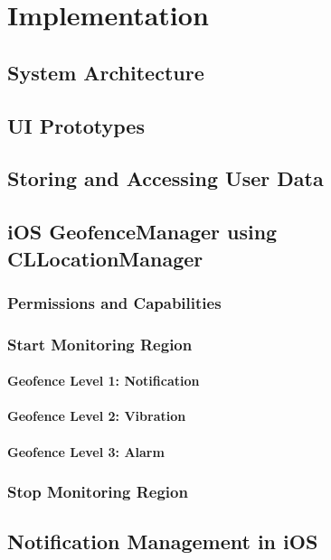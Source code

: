 \chapter{Implementation}
\label{cha:Implementation}

\section{System Architecture}
\section{UI Prototypes}
\section{Storing and Accessing User Data}

\section{iOS GeofenceManager using CLLocationManager}
\subsection{Permissions and Capabilities}
\subsection{Start Monitoring Region}
\subsubsection{Geofence Level 1: Notification}
\subsubsection{Geofence Level 2: Vibration}
\subsubsection{Geofence Level 3: Alarm}
\subsection{Stop Monitoring Region}

\section{Notification Management in iOS}
